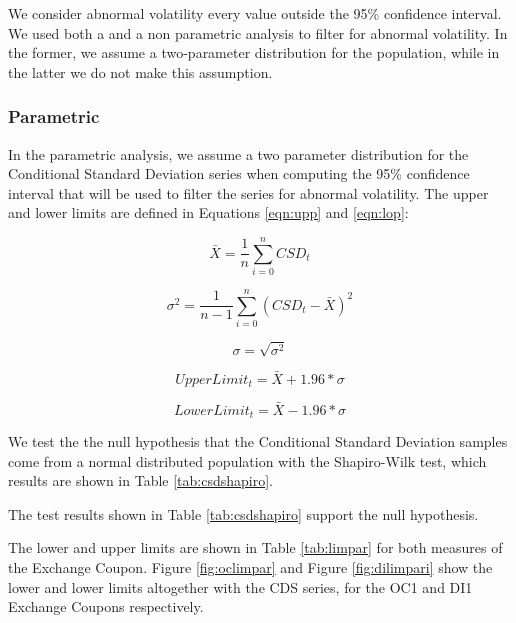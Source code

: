 \documentclass[a4paper]{article}
\begin{document}






We consider abnormal volatility every value outside the 95\% confidence interval. We used both a  and a non parametric analysis to filter for abnormal volatility. In the former, we assume a two-parameter distribution for the population, while in the latter we do not make this assumption.

\subsubsection{Parametric}

In the parametric analysis, we assume a two parameter distribution for the Conditional Standard Deviation series when computing the 95\% confidence interval that will be used to filter the series for abnormal volatility. The upper and lower limits are defined in Equations \ref{eqn:upp} and \ref{eqn:lop}: 


$$\bar{X} = \frac{1}{n} \displaystyle\sum_{i=0}^{n} CSD_t$$

$$\sigma^2 = \frac{1}{n-1} \displaystyle\sum_{i=0}^{n} (CSD_t - \bar{X})^2$$

$$\sigma = \sqrt{\sigma^2}$$

\begin{equation}
\label{eqn:upp}
UpperLimit_t = \bar{X} + 1.96 * \sigma
\end{equation}

\begin{equation}
\label{eqn:lop}
LowerLimit_t = \bar{X} - 1.96 * \sigma
\end{equation}


We test the the null hypothesis that the Conditional Standard Deviation samples come from a normal distributed population with the Shapiro-Wilk test, which results are shown in Table \ref{tab:csdshapiro}.



The test results shown in Table \ref{tab:csdshapiro} support the null hypothesis.

The lower and upper limits are shown in Table \ref{tab:limpar} for both measures of the Exchange Coupon. Figure \ref{fig:oclimpar} and Figure \ref{fig:dilimpari} show the lower and lower limits altogether with the CDS series, for the OC1 and DI1 Exchange Coupons respectively.


\end{document}
